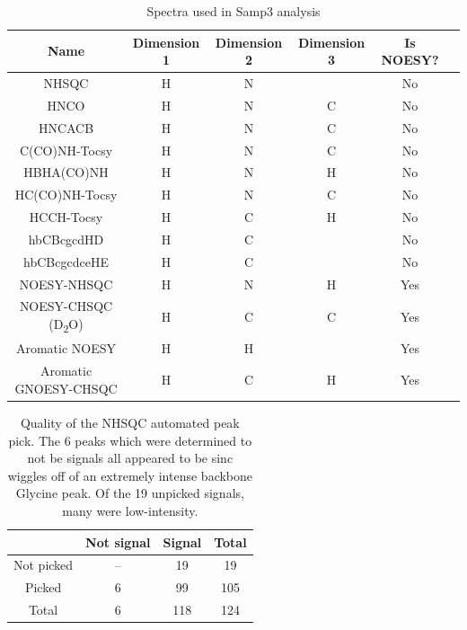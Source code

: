 \begin{table}[h]
    \begin{tabular}{ | c || c | c | c | c | c |}
    \hline
      Name  &  Dimension 1  &  Dimension 2  &  Dimension 3  &  Is NOESY?   \\    \hline
      NHSQC         & H & N &   & No            \\    \hline
      HNCO          & H & N & C & No            \\    \hline
      HNCACB        & H & N & C & No            \\    \hline
      C(CO)NH-Tocsy & H & N & C & No            \\    \hline
      HBHA(CO)NH    & H & N & H & No            \\    \hline
      HC(CO)NH-Tocsy & H & N & C & No           \\    \hline
      HCCH-Tocsy    & H & C & H & No            \\    \hline
      hbCBcgcdHD    & H & C &  & No             \\    \hline
      hbCBcgcdceHE  & H & C &  & No             \\    \hline
      NOESY-NHSQC   & H & N & H & Yes           \\    \hline
      NOESY-CHSQC (D\textsubscript{2}O) & H & C & C & Yes \\    \hline
      Aromatic NOESY & H & H &  & Yes           \\    \hline
      Aromatic GNOESY-CHSQC & H & C & H & Yes   \\    \hline
    \end{tabular}
    \caption{Spectra used in Samp3 analysis}
    \label{samp3_spectra}
\end{table}

\begin{table}
    \begin{tabular}{ | c || c | c || c| }
      \hline
                    &  Not signal   &  Signal   &  Total    \\  \hline \hline
      Not picked    &  --           &  19       &  19       \\  \hline
      Picked        &  6            &  99       &  105      \\  \hline \hline
      Total         &  6            &  118      &  124      \\  \hline
    \end{tabular}
    \caption[Quality of the NHSQC automated peak pick.]
            {Quality of the NHSQC automated peak pick.  The 6 peaks which
             were determined to not be signals all appeared to be sinc wiggles
             off of an extremely intense backbone Glycine peak.  Of the 19 
             unpicked signals, many were low-intensity.}
    \label{nhsqc_peakpick}
\end{table}

